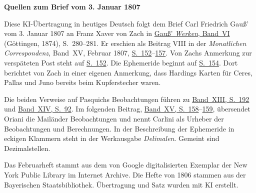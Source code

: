 \clearpage\thispagestyle{empty}
\begin{center}\textbf{Quellen zum Brief vom 3. Januar 1807}\end{center}
\noindent Diese KI-Übertragung in heutiges Deutsch folgt dem Brief Carl Friedrich Gauß’ vom 3. Januar 1807 an Franz Xaver von Zach in \href{https://gdz.sub.uni-goettingen.de/id/PPN236007467}{Gauß’ \textit{Werken}, Band~VI} (Göttingen, 1874), S.~280--281. Er erschien als Beitrag VIII in der \textit{Monatlichen Correspondenz}, Band~XV, Februar 1807, \href{https://archive.org/details/bub_gb_sKAAAAAAMAAJ/page/n157/mode/1up}{S.~152}--\href{https://archive.org/details/bub_gb_sKAAAAAAMAAJ/page/n162/mode/1up}{157}. Von Zachs Anmerkung zur verspäteten Post steht auf \href{https://archive.org/details/bub_gb_sKAAAAAAMAAJ/page/n157/mode/1up}{S.~152}. Die Ephemeride beginnt auf \href{https://archive.org/details/bub_gb_sKAAAAAAMAAJ/page/n159/mode/1up}{S.~154}. Dort berichtet von Zach in einer eigenen Anmerkung, dass Hardings Karten für Ceres, Pallas und Juno bereits beim Kupferstecher waren.
\par\medskip
Die beiden Verweise auf Pasquichs Beobachtungen führen zu \href{https://www.digitale-sammlungen.de/en/view/bsb10538605?page=200}{Band~XIII, S.~192} und \href{https://www.digitale-sammlungen.de/en/view/bsb10538606?page=102}{Band~XIV, S.~92}. Im folgenden Beitrag, \href{https://archive.org/details/bub_gb_sKAAAAAAMAAJ/page/n163/mode/1up}{Band~XV, S.~158}--\href{https://archive.org/details/bub_gb_sKAAAAAAMAAJ/page/n164/mode/1up}{159}, übersendet Oriani die Mailänder Beobachtungen und nennt Carlini als Urheber der Beobachtungen und Berechnungen. In der Beschreibung der Ephemeride in eckigen Klammern steht in der Werkausgabe \emph{Delimalen}. Gemeint sind Dezimalstellen.
\par\medskip
Das Februarheft stammt aus dem von Google digitalisierten Exemplar der New York Public Library im Internet Archive. Die Hefte von 1806 stammen aus der Bayerischen Staatsbibliothek. Übertragung und Satz wurden mit KI erstellt.
\clearpage
